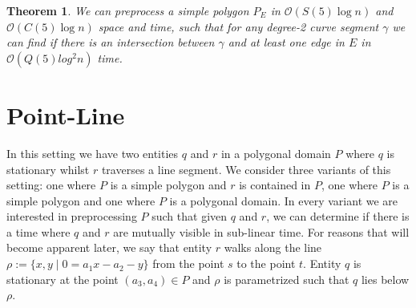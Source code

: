 \documentclass[a4paper, UKenglish]{paper}
\newtheorem{theorem}{Theorem}
\begin{document}
\begin{theorem}
    We can preprocess a simple polygon $P_E$ in $\mathcal{O}(S(5) \log n)$ and $\mathcal{O}(C(5) \log n)$ space and time, such that for any degree-2 curve segment $\gamma$ we can find if there is an intersection between $\gamma$ and at least one edge in $E$ in $\mathcal{O}( Q(5) log^2 n)$ time. 
\end{theorem}

\section{Point-Line}


In this setting we have two entities $q$ and $r$ in a polygonal domain $P$ where $q$ is stationary whilst $r$ traverses a line segment. We consider three variants of this setting: one where $P$ is a simple polygon and $r$ is contained in $P$, one where $P$ is a simple polygon and one where $P$ is a polygonal domain. In every variant we are interested in preprocessing $P$ such that given $q$ and $r$, we can determine if there is a time where $q$ and $r$ are mutually visible in sub-linear time. For reasons that will become apparent later, we say that entity $r$ walks along the line $\rho := \{ x,y \mid  0 = a_1 x - a_2 - y \}$ from the point $s$ to the point $t$. Entity $q$ is stationary at the point $(a_3, a_4) \in P$ and $\rho$ is parametrized such that $q$ lies below $\rho$.
\end{document}
